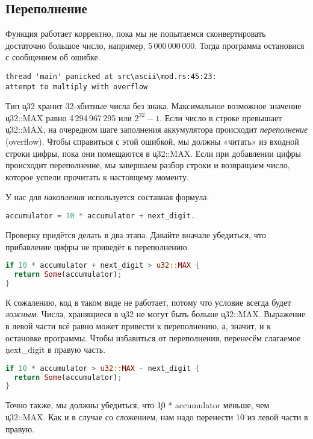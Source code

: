\subsection{Переполнение}

Функция работает корректно, пока мы не попытаемся сконвертировать достаточно большое число, например, 5\,000\,000\,000.
Тогда программа остановися с сообщением об ошибке.

\begin{lstlisting}
thread 'main' panicked at src\ascii\mod.rs:45:23:
attempt to multiply with overflow
\end{lstlisting}

Тип \c{u32} хранит 32-хбитные числа без знака.
Максимальное возможное значение \c{u32::MAX} равно 4\,294\,967\,295 или $2^32-1$.
Если число в строке превышает \c{u32::MAX}, на очередном шаге заполнения аккумулятора происходит {\em переполнение} (overflow).
Чтобы справиться с этой ошибкой, мы должны «читать» из входной строки цифры, пока они помещаются в \c{u32::MAX}.
Если при добавлении цифры происходит переполнение, мы завершаем разбор строки и возвращаем число, которое успели прочитать к настоящему моменту.

У нас для {\em накопления} используется составная формула.

\begin{lstlisting}[language=Rust]
accumulator = 10 * accumulator + next_digit.
\end{lstlisting}

Проверку придётся делать в два этапа. Давайте вначале убедиться, что прибавление цифры не приведёт к переполнению.

\begin{lstlisting}[language=Rust]
if 10 * accumulator + next_digit > u32::MAX {
  return Some(accumulator);
}
\end{lstlisting}

К сожалению, код в таком виде не работает, потому что условие всегда будет {\em ложным}.
Числа, хранящиеся в \c{u32} не могут быть больше \c{u32::MAX}.
Выражение в левой части всё равно может привести к переполнению, а, значит, и к остановке программы.
Чтобы избавиться от переполнения, перенесём слагаемое \c{next\_digit} в правую часть.

\begin{lstlisting}[language=Rust]
if 10 * accumulator > u32::MAX - next_digit {
  return Some(accumulator);
}
\end{lstlisting}

Точно также, мы должны убедиться, что \c{10 * accumulator} меньше, чем \c{u32::MAX}.
Как и в случае со сложением, нам надо перенести 10 из левой части в правую.


